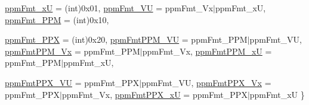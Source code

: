 \begin{DoxyCompactItemize}
\hyperlink{classCRPString_a01c768ebc97b32bbd7bdbe6ca227c3a2a210de584c5de2198d270ef046f346b54}{ppmFmt\_\-xU} =  (int)0x01, 
\hyperlink{classCRPString_a01c768ebc97b32bbd7bdbe6ca227c3a2afb75ab021a09066b01b1b4f28d79d667}{ppmFmt\_\-VU} =  ppmFmt\_\-Vx$|$ppmFmt\_\-xU, 
\hyperlink{classCRPString_a01c768ebc97b32bbd7bdbe6ca227c3a2a73208d6c62e15962360564bd839ef531}{ppmFmt\_\-PPM} =  (int)0x10, 
\par
\hyperlink{classCRPString_a01c768ebc97b32bbd7bdbe6ca227c3a2a27eef2174538d8c39bc60c295c748af9}{ppmFmt\_\-PPX} =  (int)0x20, 
\hyperlink{classCRPString_a01c768ebc97b32bbd7bdbe6ca227c3a2a35540c80148657b2d0aea5cc7a7b6790}{ppmFmtPPM\_\-VU} =  ppmFmt\_\-PPM$|$ppmFmt\_\-VU, 
\hyperlink{classCRPString_a01c768ebc97b32bbd7bdbe6ca227c3a2a69967fc21c9b94a1742fb363b7bde6ea}{ppmFmtPPM\_\-Vx} =  ppmFmt\_\-PPM$|$ppmFmt\_\-Vx, 
\hyperlink{classCRPString_a01c768ebc97b32bbd7bdbe6ca227c3a2abe84a5c14b3600afbcd78be133363d84}{ppmFmtPPM\_\-xU} =  ppmFmt\_\-PPM$|$ppmFmt\_\-xU, 
\par
\hyperlink{classCRPString_a01c768ebc97b32bbd7bdbe6ca227c3a2a4341b404226aec9087e01fd5d46066c7}{ppmFmtPPX\_\-VU} =  ppmFmt\_\-PPX$|$ppmFmt\_\-VU, 
\hyperlink{classCRPString_a01c768ebc97b32bbd7bdbe6ca227c3a2a46a3eb9ac2d6cff28b8e1b02995fb7b8}{ppmFmtPPX\_\-Vx} =  ppmFmt\_\-PPX$|$ppmFmt\_\-Vx, 
\hyperlink{classCRPString_a01c768ebc97b32bbd7bdbe6ca227c3a2a1363a26a91003d3356a5c7475996437b}{ppmFmtPPX\_\-xU} =  ppmFmt\_\-PPX$|$ppmFmt\_\-xU
 \}
\end{DoxyCompactItemize}
